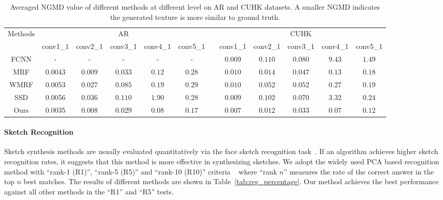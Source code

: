 \documentclass[10pt,twocolumn,letterpaper]{article}
\begin{document}
\begin{table}[htbp]
\begin{center}
{\small
\begin{tabular}{ccccccccccccc}
\hline
\multicolumn{2}{c|}{\multirow {2}{*}{Methods}} &\multicolumn{5}{c}{AR} & & \multicolumn{5}{c}{CUHK} \\
\cline{3-7} \cline{9-13} \multicolumn{2}{c|}{} & conv1\_1 & conv2\_1 & conv3\_1 & conv4\_1 & conv5\_1 & &
 conv1\_1 & conv2\_1 & conv3\_1 & conv4\_1 & conv5\_1  \\
\hline
\multicolumn{2}{c|}{FCNN} & - & - & - & - & - & & { $0.009$} &{ $0.110$} & {$0.080$} & {$9.43$} & {$1.49$}  \\
\multicolumn{2}{c|}{MRF} & 0.0043 & 0.009 & {$0.033$}  & {$0.12$} & 0.28 & & { $0.010$} &{ $0.014$} & {$0.047$} & $0.13$ & $0.18$  \\
\multicolumn{2}{c|}{WMRF} & 0.0053 & 0.027 & {$0.085$}  & {$0.19$} & 0.29 & & { $0.010$} &{ $0.052$} & {$0.052$} & {$0.27$} & {$0.19$}  \\
\multicolumn{2}{c|}{SSD} & 0.0056 & 0.036 & {$0.110$} & {$1.90$} & 0.28 & & { $0.009$} &{ $0.102$} & {$0.070$} & {$3.32$} & {$0.24$}  \\
\multicolumn{2}{c|}{Ours} & {\color{red} 0.0035} & {\color{red} 0.008} & {\color{red} $0.029$} & {\color{red} $0.08$} & {\color{red} $0.17$} & & {\color{red}$0.007$} &{\color{red} $0.012$} & {\color{red} $0.033$} & {\color{red} $0.07$} & {\color{red} $0.12$}  \\
\hline
\end{tabular}
}
\end{center}
\caption{Averaged NGMD value of different methods at different level on AR and CUHK datasets. A smaller NGMD indicates the generated texture is more similar to ground truth.}
\label{tab:NGMD}
\end{table}

\paragraph*{Sketch Recognition} Sketch synthesis methods are usually evaluated quantitatively  via the face sketch recognition task~\cite{song2014real,wang2009face,zhang2015end,zhou2012markov}. If an algorithm achieves higher sketch recognition rates, it suggests that this method is more effective in synthesizing sketches. We adopt the widely used PCA based recognition method with ``rank-1 (R1)'', ``rank-5 (R5)'' and ``rank-10 (R10)'' criteria ~\cite{wang2009face} where ``rank $n$'' measures the rate of the correct answer in the top $n$ best matches. The results of different methods are shown in Table~\ref{tab:reg_percentage}. Our method achieves the best performance against all other methods in the ``R1'' and ``R5'' tests. 
\end{document}

